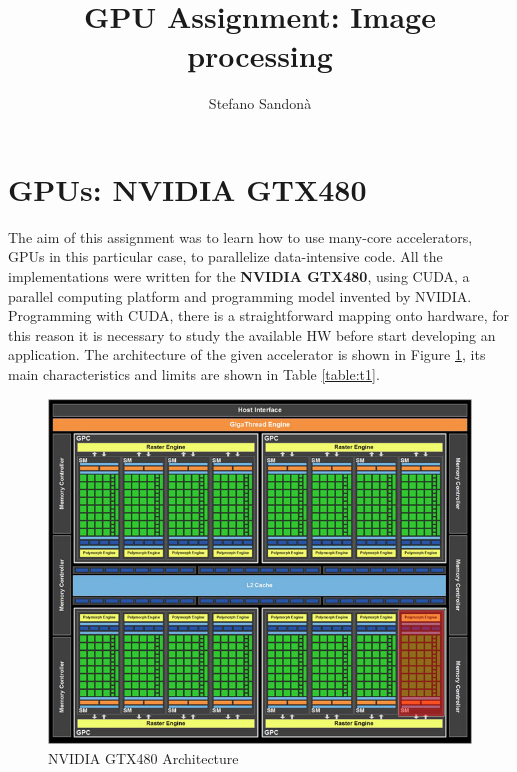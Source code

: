 \documentclass[a4paper]{article}
\begin{document}
\title{GPU Assignment: Image processing}
\author{Stefano Sandonà}
\date{}
		
\maketitle

\section{GPUs: NVIDIA GTX480}
\label{sec:nvidia}
The aim of this assignment was to learn how to use many-core accelerators, GPUs in this particular case, to parallelize data-intensive code. All the implementations were written for the \textbf{NVIDIA GTX480}, using CUDA, a parallel computing platform and programming model invented by NVIDIA. Programming with CUDA, there is a straightforward mapping onto hardware, for this reason it is necessary to study the available HW before start developing an application. The architecture of the given accelerator is shown in Figure \ref{fig:gtx}, its main characteristics and limits are shown in Table \ref{table:t1}.

\begin{figure}[ht]
    \centering
    \includegraphics[width=0.7\linewidth]{gtx}
    \caption{NVIDIA GTX480 Architecture}
    \label{fig:gtx}
\end{figure}
\FloatBarrier
\end{document}
